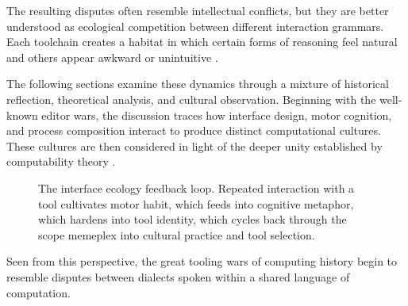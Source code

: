 \documentclass[12pt]{article}
\theoremstyle{definition}
\begin{document}
The resulting disputes often resemble intellectual conflicts, but they
are better understood as ecological competition between different
interaction grammars. Each toolchain creates a habitat in which certain
forms of reasoning feel natural and others appear awkward or
unintuitive \cite{brooks1975}.

The following sections examine these dynamics through a mixture of
historical reflection, theoretical analysis, and cultural observation.
Beginning with the well-known editor wars, the discussion traces how
interface design, motor cognition, and process composition interact to
produce distinct computational cultures. These cultures are then
considered in light of the deeper unity established by computability
theory \cite{church1936,turing1936}.

\begin{figure}[h]
\centering
{}
\caption{The interface ecology feedback loop. Repeated interaction with a
tool cultivates motor habit, which feeds into cognitive metaphor, which
hardens into tool identity, which cycles back through the scope memeplex
into cultural practice and tool selection.}
\label{fig:ecology_loop}
\end{figure}

Seen from this perspective, the great tooling wars of computing history
begin to resemble disputes between dialects spoken within a shared
language of computation.
\end{document}
